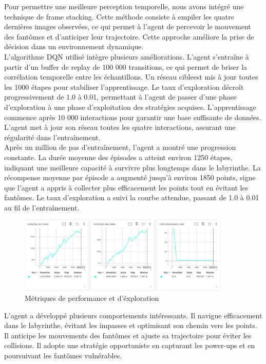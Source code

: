 \documentclass{article}
\begin{document}
Pour permettre une meilleure perception temporelle, nous avons intégré une technique de frame stacking. Cette méthode consiste à empiler les quatre dernières images observées, ce qui permet à l’agent de percevoir le mouvement des fantômes et d’anticiper leur trajectoire. Cette approche améliore la prise de décision dans un environnement dynamique.\\

L’algorithme DQN utilisé intègre plusieurs améliorations. L’agent s’entraîne à partir d’un buffer de replay de 100 000 transitions, ce qui permet de briser la corrélation temporelle entre les échantillons. Un réseau cibleest mis à jour toutes les 1000 étapes pour stabiliser l’apprentissage. Le taux d’exploration décroît progressivement de 1.0 à 0.01, permettant à l’agent de passer d’une phase d’exploration à une phase d’exploitation des stratégies acquises. L’apprentissage commence après 10 000 interactions pour garantir une base suffisante de données. L’agent met à jour son réseau toutes les quatre interactions, assurant une régularité dans l’entraînement.\\

Après un million de pas d’entraînement, l’agent a montré une progression constante. La durée moyenne des épisodes a atteint environ 1250 étapes, indiquant une meilleure capacité à survivre plus longtemps dans le labyrinthe. La récompense moyenne par épisode a augmenté jusqu’à environ 1850 points, signe que l’agent a appris à collecter plus efficacement les points tout en évitant les fantômes. Le taux d’exploration a suivi la courbe attendue, passant de 1.0 à 0.01 au fil de l’entraînement.\\

\begin{figure}[ht]
    \centering
    \includegraphics[width=0.9\textwidth]{13.png}
    \caption{Métriques de performance et d'éxploration}
\end{figure}

L’agent a développé plusieurs comportements intéressants. Il navigue efficacement dans le labyrinthe, évitant les impasses et optimisant son chemin vers les points. Il anticipe les mouvements des fantômes et ajuste sa trajectoire pour éviter les collisions. Il adopte une stratégie opportuniste en capturant les power-ups et en poursuivant les fantômes vulnérables.\\
\end{document}
